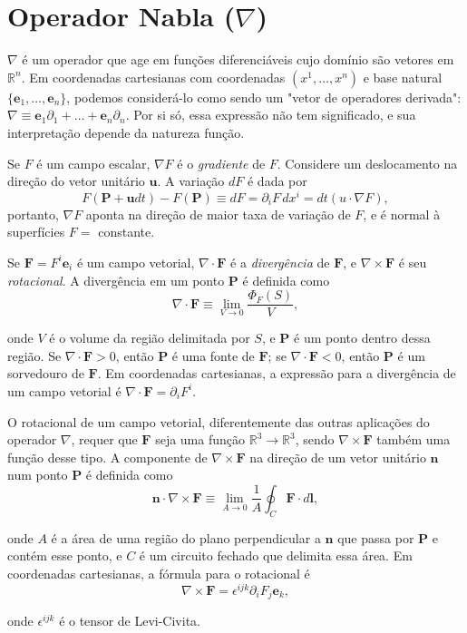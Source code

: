 \section{Operador Nabla ($\nabla$)}
$\nabla$ é um operador que age em funções diferenciáveis cujo domínio são vetores em $\mathbb{R}^n$. Em coordenadas cartesianas com coordenadas $(x^1, \dots , x^n)$ e base natural $\{\mathbf{e}_1, \dots, \mathbf{e}_n\}$, podemos considerá-lo como sendo um "vetor de operadores derivada":  $\nabla \equiv \mathbf{e}_1\partial_1 + \dots + \mathbf{e}_n\partial_n$. Por si só, essa expressão não tem significado, e sua interpretação depende da natureza função.

Se $F$ é um campo escalar, $\nabla F$ é o \textit{gradiente} de $F$. Considere um deslocamento na direção do vetor unitário $\mathbf{u}$. A variação $dF$ é dada por 
\begin{equation*}
F(\mathbf{P}+ \mathbf{u}dt) - F(\mathbf{P}) \equiv dF = \partial_i F \, dx^i = dt(u \cdot \nabla F),
\end{equation*}
\noindent portanto, $\nabla F$ aponta na direção de maior taxa de variação de $F$, e é normal à superfícies $F =$ constante.

Se $\mathbf{F} = F^i \mathbf{e}_i$ é um campo vetorial, $\nabla \cdot \mathbf{F}$ é a \textit{divergência} de $\mathbf{F}
$, e $\nabla \times \mathbf{F}$ é seu \textit{rotacional}. A divergência em um ponto $\mathbf{P}$ é definida como 
\begin{equation}
\nabla \cdot \mathbf{F} \equiv \lim\limits_{V \to 0} \frac{\Phi_F(S)}{V} ,
\label{def: div}
\end{equation}

\noindent onde $V$ é o volume da região delimitada por $S$, e $\mathbf{P}$ é um ponto dentro dessa região. Se $\nabla \cdot \mathbf{F} > 0$, então $\mathbf{P}$ é uma fonte de $\mathbf{F}$; se $\nabla \cdot \mathbf{F} < 0$, então $\mathbf{P}$ é um sorvedouro de $\mathbf{F}$. Em coordenadas cartesianas, a expressão para a divergência de um campo vetorial é $\nabla \cdot \mathbf{F} = \partial_i F^i$.

O rotacional de um campo vetorial, diferentemente das outras aplicações do operador $\nabla$, requer que $\mathbf{F}$ seja uma função $\mathbb{R}^3 \to \mathbb{R}^3$, sendo $\nabla \times \mathbf{F}$ também uma função desse tipo. A componente de $\nabla \times \mathbf{F}$ na direção de um vetor unitário $\mathbf{n}$ num ponto $\mathbf{P}$ é definida como
\begin{equation}
\mathbf{n} \cdot \nabla \times \mathbf{F} \equiv \lim\limits_{A \to 0} \frac{1}{A} \oint_C \mathbf{F} \cdot d\mathbf{l},
\label{def: rot}
\end{equation}

\noindent onde $A$ é a área de uma região do plano perpendicular a $\mathbf{n}$ que passa por $\mathbf{P}$ e contém esse ponto, e $C$ é um circuito fechado que delimita essa área. Em coordenadas cartesianas, a fórmula para o rotacional é 
\begin{equation}
\nabla \times \mathbf{F} = \epsilon^{ijk}\partial_i F_j \mathbf{e}_k,
\label{eq: xyz_rot}
\end{equation}

\noindent onde $\epsilon^{ijk}$ é o tensor de Levi-Civita.

